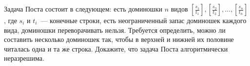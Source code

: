 Задача Поста состоит в следующем: есть доминошки $n$ видов $\left[\frac{s_1}{t_1}\right],
\left[\frac{s_2}{t_2}\right], \ldots, \left[\frac{s_n}{t_n}\right]$, где $s_i$ и $t_i$~--- конечные
строки, есть неограниченный запас доминошек каждого вида, доминошки переворачивать нельзя. Требуется
определить, можно ли составить несколько доминошек так, чтобы в верхней и нижней их половине читалась
одна и та же строка. Докажите, что задача Поста алгоритмически неразрешима. 